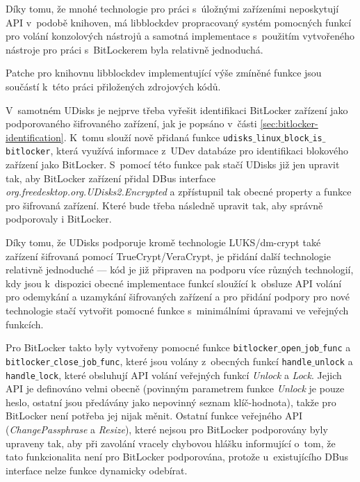 Díky tomu, že mnohé technologie pro práci s~úložnými zařízeními neposkytují API v~podobě knihoven, má libblockdev propracovaný systém pomocných funkcí pro volání konzolových nástrojů a samotná implementace s~použitím vytvořeného nástroje pro práci s~BitLockerem byla relativně jednoduchá.

Patche pro knihovnu libblockdev implementující výše zmíněné funkce jsou součástí k~této práci přiložených zdrojových kódů.

\label{sec:udisks-implementation}

V~samotném UDisks je nejprve třeba vyřešit identifikaci BitLocker zařízení jako podporovaného šifrovaného zařízení, jak je popsáno v~části \ref{sec:bitlocker-identification}. K~tomu slouží nově přidaná funkce \texttt{udisks$\_$linux$\_$block$\_$is$\_$bitlocker}, která využívá informace z~UDev databáze pro identifikaci blokového zařízení jako BitLocker. S~pomocí této funkce pak stačí UDisks již jen upravit tak, aby BitLocker zařízení přidal DBus interface \emph{org.freedesktop.org.UDisks2.Encrypted} a zpřístupnil tak obecné property a funkce pro šifrovaná zařízení. Které bude třeba následně upravit tak, aby správně podporovaly i BitLocker.

Díky tomu, že UDisks podporuje kromě technologie LUKS/dm-crypt také zařízení šifrovaná pomocí TrueCrypt/VeraCrypt, je přidání další technologie relativně je\-dno\-du\-ché --- kód je již připraven na podporu více různých technologií, kdy jsou k~dispozici obecné implementace funkcí sloužící k~obsluze API volání pro odemykání a uzamykání šifrovaných zařízení a pro přidání podpory pro nové technologie stačí vytvořit pomocné funkce s~minimálními úpravami ve veřejných funkcích.

Pro BitLocker takto byly vytvořeny pomocné funkce \texttt{bitlocker$\_$open$\_$job$\_$func} a \texttt{bitlocker$\_$close$\_$job$\_$func}, které jsou volány z~obecných funkcí \texttt{handle$\_$unlock} a \texttt{handle$\_$lock}, které obsluhují API volání veřejných funkcí \emph{Unlock} a \emph{Lock}. Jejich API je definováno velmi obecně (povinným parametrem funkce \emph{Unlock} je pouze heslo, ostatní jsou předávány jako nepovinný seznam klíč-hodnota\cite{Storaged2019}), takže pro BitLocker není potřeba jej nijak měnit. Ostatní funkce veřejného API (\emph{ChangePassphrase} a \emph{Resize}), které nejsou pro BitLocker podporovány byly upraveny tak, aby při zavolání vracely chybovou hlášku informující o~tom, že tato funkcionalita není pro BitLocker podporována, protože u~existujícího DBus interface nelze funkce dynamicky odebírat.

